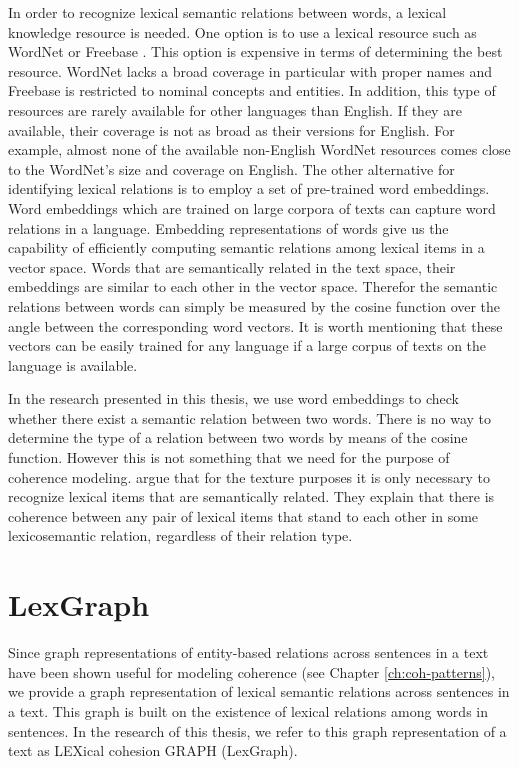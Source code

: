 In order to recognize lexical semantic relations between words, a lexical knowledge resource is needed.   
One option is to use a lexical resource such as WordNet \cite{fellbaum98} or Freebase \cite{bollacker08}.  
This option is expensive in terms of determining the best resource.  
WordNet lacks a broad coverage in particular with proper names and Freebase is restricted to nominal concepts and entities. 
In addition, this type of resources are rarely available for other languages than English.
If they are available, their coverage is not as broad as their versions for English. 
For example, almost none of the available non-English WordNet resources comes close to the WordNet's size and coverage on English. 
The other alternative for identifying lexical relations is to employ a set of pre-trained word embeddings. 
Word embeddings which are trained on large corpora of texts can capture word relations in a language. 
Embedding representations of words give us the capability of efficiently computing semantic relations among lexical items in a vector space. 
Words that are semantically related in the text space, their embeddings are similar to each other in the vector space. 
Therefor the semantic relations between words can simply be measured by the cosine function over the angle between the corresponding word vectors. 
It is worth mentioning that these vectors can be easily trained for any language if a large corpus of texts on the language is available.  

In the research presented in this thesis, we use word embeddings to check whether there exist a semantic relation between two words.  
There is no way to determine the type of a relation between two words by means of the cosine function. 
However this is not something that we need for the purpose of coherence modeling. 
 argue that for the texture purposes it is only necessary to recognize lexical items that are semantically related. 
They explain that there is coherence between any pair of lexical items that stand to each other in some lexicosemantic relation, regardless of their relation type. 

\section{LexGraph}
\label{sec:lex-graph-representation}
Since graph representations of entity-based relations across sentences in a text have been shown useful for modeling coherence (see Chapter \ref{ch:coh-patterns}), we provide a graph representation of lexical semantic relations across sentences in a text. 
This graph is built on the existence of lexical relations among words in sentences. 
In the research of this thesis, we refer to this graph representation of a text as LEXical cohesion GRAPH (LexGraph). 

